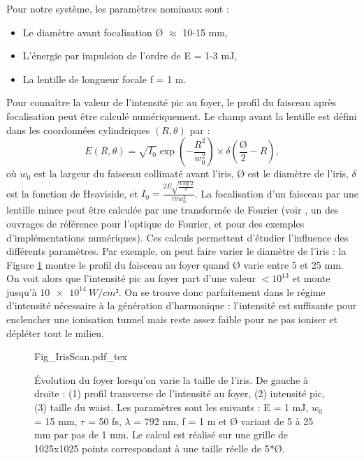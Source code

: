 Pour notre système, les paramètres nominaux sont :
\begin{itemize}
\item Le diamètre avant focalisation \O{} $\approx$ 10-15 mm,
\item L'énergie par impulsion de l'ordre de E = 1-3 mJ,
\item La lentille de longueur focale f = 1 m. \\
\end{itemize}
Pour connaître la valeur de l'intensité pic au foyer, le profil du faisceau après focalisation peut être calculé numériquement. Le champ avant la lentille est défini dans les coordonnées cylindriques $(R,\theta)$ par :
\begin{equation*}
E(R,\theta) = \sqrt{I_0} \exp{\left(-\frac{R^2}{w_0^2}\right)}\times\delta(\frac{\mbox{\O}}{2}-R),
\end{equation*}
où $w_0$ est la largeur du faisceau collimaté avant l'iris, \O{}  est le diamètre de l'iris, $\delta$ est la fonction de Heaviside, et $I_0 = \frac{2E\sqrt{\frac{4\log{2}}{\pi}}}{\tau\pi w_0^2}$.
La focalisation d'un faisceau par une lentille mince peut être calculée par une transformée de Fourier (voir , un des ouvrages de référence pour l'optique de Fourier, et  pour des exemples d'implémentations numériques). Ces calculs permettent d'étudier l'influence des différents paramètres. Par exemple, on peut faire varier le diamètre de l'iris : la Figure \ref{Fig:IrisScan} montre le profil du faisceau au foyer quand \O{} varie entre 5 et 25 mm. On voit alors que l'intensité pic au foyer part d'une valeur $<10^{13}$ et monte jusqu'à $\SI{10e14}{W/cm²}$. On se trouve donc parfaitement dans le régime d'intensité nécessaire à la génération d'harmonique : l'intensité est suffisante pour enclencher une ionisation tunnel mais reste assez faible pour ne pas ioniser et dépléter tout le milieu.

\begin{figure}[!ht]
\centering
\def\svgwidth{\columnwidth}
{Fig_IrisScan.pdf_tex}
\caption{\'{E}volution du foyer lorsqu'on varie la taille de l'iris. De gauche à droite : (1) profil transverse de l'intensité au foyer, (2) intensité pic, (3) taille du waist. Les paramètres sont les suivants : E = 1 mJ, $w_0$ = 15 mm, $\tau$ = 50 fs, $\lambda$ = 792 nm, f = 1 m et \O{} variant de 5 à 25 mm par pas de 1 mm. Le calcul est réalisé sur une grille de 1025x1025 points correspondant à une taille réelle de 5*\O{}.}
\label{Fig:IrisScan}
\end{figure}

